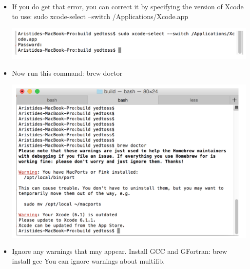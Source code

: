 \documentclass[12pt]{article}
\begin{document}
\begin{itemize}
		\item If you do get that error, you can correct it by specifying the version of Xcode to use:
		{ \color{blue} sudo xcode-select --switch /Applications/Xcode.app}
		
		\vspace{\abovedisplayskip}
		\begin{minipage}{\linewidth}
			\centering
			\includegraphics[scale=0.75]{img/9}
		\end{minipage}
		\vspace{\belowdisplayskip}
		
		\item Now run this command:
			{ \color{blue} brew doctor}
			
			\vspace{\abovedisplayskip}
			\begin{minipage}{\linewidth}
				\centering
				\includegraphics[scale=0.75]{img/10}
			\end{minipage}
			\vspace{\belowdisplayskip}
			
			\item Ignore any warnings that may appear.
			Install GCC and GFortran:
				{ \color{blue} brew install gcc}
			You can ignore warnings about multilib.
			

\end{itemize}
\end{document}
